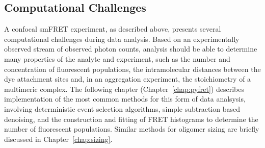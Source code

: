 



\subsection{Computational Challenges}
A confocal smFRET experiment, as described above, presents several computational challenges during data analysis. Based on an experimentally observed stream of observed photon counts, analysis should be able to determine many properties of the analyte and experiment, such as the number and concentration of fluorescent populations, the intramolecular distances between the dye attachment sites and, in an aggregation experiment, the stoichiometry of a multimeric complex. The following chapter (Chapter~\ref{chap:pyfret}) describes implementation of the most common methods for this form of data analsysis, involving deterministic event selection algorithms, simple subtraction based denoising, and the construction and fitting of FRET histograms to determine the number of fluorescent populations. Similar methods for oligomer sizing are briefly discussed in Chapter~\ref{chap:sizing}. 

